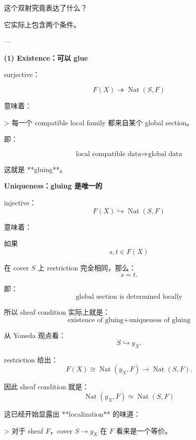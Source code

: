 \documentclass{beamer}
\begin{document}
\begin{frame}[fragile]{这个双射究竟表达了什么？}
\begin{markdown}
它实际上包含两个条件。

---

\textbf{(1) Existence：可以 glue}

surjective：

$$
F(X)\twoheadrightarrow\operatorname{Nat}(S,F)
$$

意味着：

> 每一个 compatible local family 都来自某个 global section。

即：

$$
\boxed{
\text{local compatible data}
\Rightarrow
\text{global data}
}
$$

这就是 **gluing**。
\end{markdown}
\end{frame}

\begin{frame}[fragile]
\begin{markdown}
\textbf{Uniqueness：gluing 是唯一的}

injective：
$$
F(X)\hookrightarrow\operatorname{Nat}(S,F)
$$

意味着：

如果
$$
s,t\in F(X)
$$

在 cover $S$ 上 restriction 完全相同，那么：
$$
s=t.
$$

即：
$$
\boxed{
\text{global section is determined locally}
}
$$

所以 sheaf condition 实际上就是：
$$
\boxed{
\text{existence of gluing}
+
\text{uniqueness of gluing}
}
$$
\end{markdown}
\end{frame}

\begin{frame}[fragile]
\begin{markdown}
从 Yoneda 观点看：
$$
S\hookrightarrow y_X.
$$

restriction 给出：
$$
F(X)
\cong
\operatorname{Nat}(y_X,F)
\longrightarrow
\operatorname{Nat}(S,F).
$$

因此 sheaf condition 就是：
$$
\boxed{
\operatorname{Nat}(y_X,F)
\simeq
\operatorname{Nat}(S,F)
}
$$

这已经开始显露出 **localization** 的味道：

> 对于 sheaf $F$，cover $S\to y_X$ 在 $F$ 看来是一个等价。
\end{markdown}
\end{frame}
\end{document}
